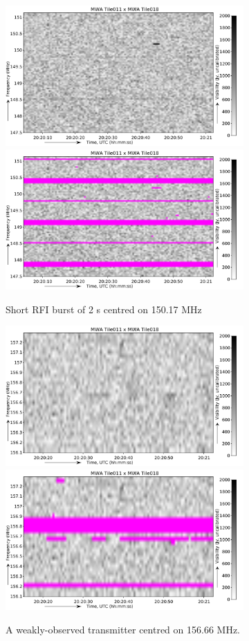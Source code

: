 \documentclass[useAMS,usenatbib]{mn2e}
\begin{document}
\noindent\begin{figure}
\begin{center}\hspace*{-0.2cm}\includegraphics[width=9.1cm]{img/150_2_mhz_example}\includegraphics[width=9.1cm]{img/150_2_mhz_flagged}
\caption{Short RFI burst of 2 s centred on 150.17 MHz}
\label{fig:150_2}
\end{center}
\end{figure}

\noindent\begin{figure}
\begin{center}\hspace*{-0.2cm}\includegraphics[width=9.1cm]{img/156_7_mhz_example}\includegraphics[width=9.1cm]{img/156_7_mhz_flagged}
\caption{A weakly-observed transmitter centred on 156.66 MHz.}
\label{fig:156_7}
\end{center}
\end{figure}
\end{document}
